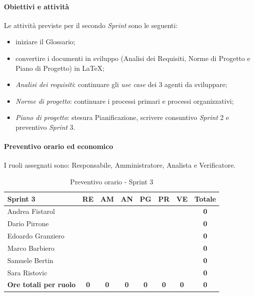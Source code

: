 \documentclass[12pt, a4paper]{article}
\begin{document}
{\paragraph{Obiettivi e attività}

Le attività previste per il secondo \emph{Sprint} sono le seguenti:

\begin{itemize}
\item
    iniziare il Glossario;
\item
  convertire i documenti in sviluppo (Analisi dei Requisiti, Norme di Progetto e Piano di Progetto) in LaTeX;
\item
  \emph{Analisi dei requisiti}: continuare gli \emph{use case} dei 3
  agenti da sviluppare;
\item
  \emph{Norme di progetto}: continuare i processi primari e processi
  organizzativi;
\item
  \emph{Piano di progetto}: stesura Pianificazione, scrivere consuntivo \emph{Sprint} 2 e preventivo \emph{Sprint} 3.
\end{itemize}


\paragraph{Preventivo orario ed
economico}\label{preventivo-orario-ed-economico-1}

I ruoli assegnati sono: Responsabile, Amministratore, Analista e
Verificatore.

\begin{table}[H]
    \centering
    \renewcommand{\arraystretch}{1.3}
    \begin{tabularx}{0.9\textwidth}{|X|c|c|c|c|c|c|c|}
        \hline
        \textbf{Sprint 3} & \textbf{RE} & \textbf{AM} & \textbf{AN} &
        \textbf{PG} & \textbf{PR} & \textbf{VE} & \textbf{Totale} \\ \hline
        Andrea Fistarol & & & & & & &\textbf{0} \\ \hline
        Dario Pirrone & & & & & & &\textbf{0} \\ \hline
        Edoardo Granziero & & & & & & &\textbf{0} \\ \hline
        Marco Barbiero & & & & & & &\textbf{0} \\ \hline
        Samuele Bertin & & & & & & &\textbf{0} \\ \hline
        Sara Ristovic & & & & & & &\textbf{0} \\ \hline
        \textbf{Ore totali per ruolo} & \textbf{0} & \textbf{0} &
        \textbf{0} & \textbf{0} & \textbf{0} & \textbf{0} & \textbf{0}\\ \hline
    \end{tabularx}
    \caption{Preventivo orario - Sprint 3}
\end{table}

}
\end{document}
